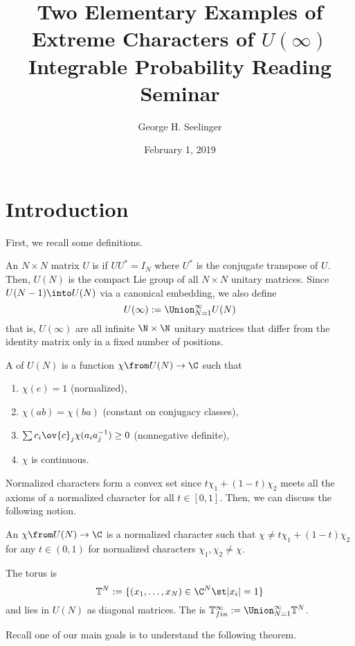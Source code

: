 \documentclass[11pt,leqno,oneside]{amsart}
\title[Two Elementary Examples of Extreme Characters of
  \(U(\infty)\)]{Two Elementary Examples of Extreme Characters of
  \(U(\infty)\) \\ Integrable Probability Reading Seminar}
\author{George H. Seelinger}
\date{February 1, 2019}
\numberwithin{thm}{section}
\newcommand{\T}{\mathbb{T}} %
\begin{document}
\maketitle
\section{Introduction}
First, we recall some definitions.
\begin{defn}
  An \(N \times N\) matrix \(U\) is  if \(U U^* = I_N\)
  where \(U^*\) is the conjugate transpose of \(U\). Then, \(U(N)\) is
  the compact Lie group of all \(N \times N\) unitary matrices. Since
  \(U(N-1) \into U(N)\) via a canonical embedding, we also define \[
    U(\infty) := \Union_{N=1}^\infty U(N)
  \]
  that is, \(U(\infty)\) are all infinite \(\N \times \N\) unitary
  matrices that differ from the identity matrix only in a fixed number
  of positions.
\end{defn}
\begin{defn}
  A  of \(U(N)\) is a function \(\chi
  \from U(N) \to \C\) such that
  \begin{enumerate}
  \item \(\chi(e) = 1\) (normalized),
  \item \(\chi(ab) = \chi(ba)\) (constant on conjugacy classes),
  \item \(\sum c_i \ov{c}_j \chi(a_i a_j^{-1}) \geq 0\) (nonnegative
    definite),
  \item \(\chi\) is continuous.
  \end{enumerate}
\end{defn}
Normalized characters form a convex set since \(t \chi_1 + (1-t)
\chi_2\) meets all the axioms of a normalized character for all \(t
\in [0,1]\). Then, we can discuss the following notion.
\begin{defn}
  An  \(\chi \from U(N) \to \C\) is a normalized
  character such that \(\chi \neq t \chi_1 + (1-t) \chi_2\) for any
  \(t \in (0,1)\) for normalized characters \(\chi_1,\chi_2 \neq
  \chi\). 
\end{defn}
\begin{defn}
  The  torus is \[
    \T^N := \{(x_1, \ldots, x_N) \in \C^N \st |x_i| = 1\}
  \]
  and lies in \(U(N)\) as diagonal matrices. The 
  is \(\T^\infty_{fin} := \Union_{N=1}^\infty \T^N\).
\end{defn}
Recall one of our main goals is to understand the following theorem.
\end{document}
